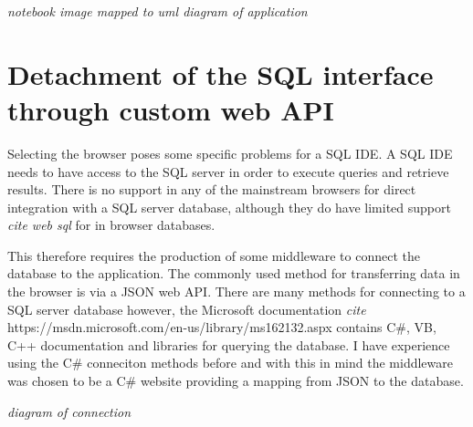 \emph{notebook image mapped to uml diagram of application}

\section{Detachment of the SQL interface through custom web
API}\label{detachment-of-the-sql-interface-through-custom-web-api}

Selecting the browser poses some specific problems for a SQL IDE. A SQL
IDE needs to have access to the SQL server in order to execute queries
and retrieve results. There is no support in any of the mainstream
browsers for direct integration with a SQL server database, although
they do have limited support \emph{cite web sql} for in browser
databases.

This therefore requires the production of some middleware to connect the
database to the application. The commonly used method for transferring
data in the browser is via a JSON web API. There are many methods for
connecting to a SQL server database however, the Microsoft documentation
\emph{cite} https://msdn.microsoft.com/en-us/library/ms162132.aspx
contains C\#, VB, C++ documentation and libraries for querying the
database. I have experience using the C\# conneciton methods before and
with this in mind the middleware was chosen to be a C\# website
providing a mapping from JSON to the database.

\emph{diagram of connection}
